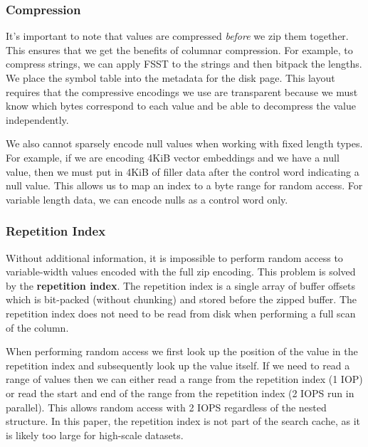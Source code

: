 \documentclass[sigconf, nonacm]{acmart}
\begin{document}
\subsubsection{Compression}

It's important to note that values are compressed \textit{before} we zip them together.  This ensures that we get the benefits of columnar compression.  For example, to compress strings, we can apply FSST to the strings and then bitpack the lengths.  We place the symbol table into the metadata for the disk page.  This layout requires that the compressive encodings we use are transparent because we must know which bytes correspond to each value and be able to decompress the value independently.

We also cannot sparsely encode null values when working with fixed length types.  For example, if we are encoding 4KiB vector embeddings and we have a null value, then we must put in 4KiB of filler data after the control word indicating a null value.  This allows us to map an index to a byte range for random access.  For variable length data, we can encode nulls as a control word only.

\subsubsection{Repetition Index}

Without additional information, it is impossible to perform random access to variable-width values encoded with the full zip encoding.  This problem is solved by the \textbf{repetition index}.  The repetition index is a single array of buffer offsets which is bit-packed (without chunking) and stored before the zipped buffer.  The repetition index does not need to be read from disk when performing a full scan of the column.

When performing random access we first look up the position of the value in the repetition index and subsequently look up the value itself.  If we need to read a range of values then we can either read a range from the repetition index (1 IOP) or read the start and end of the range from the repetition index (2 IOPS run in parallel).  This allows random access with 2 IOPS regardless of the nested structure.  In this paper, the repetition index is not part of the search cache, as it is likely too large for high-scale datasets.
\end{document}
